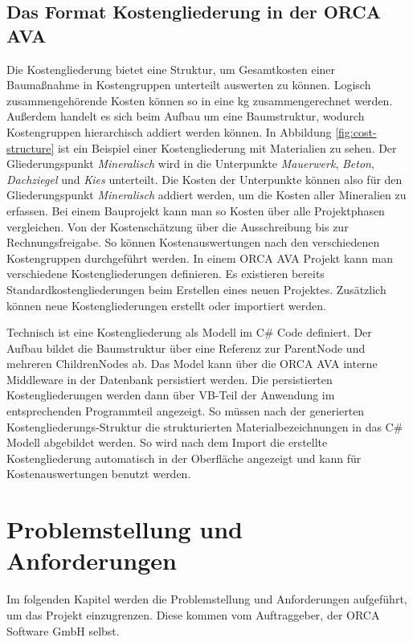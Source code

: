\section{Das Format Kostengliederung in der ORCA AVA}
\label{c:basics:coststructure}
Die Kostengliederung bietet eine Struktur, um Gesamtkosten einer Baumaßnahme in Kostengruppen unterteilt auswerten zu können. Logisch zusammengehörende Kosten können so in eine \ac{kg} zusammengerechnet werden. Außerdem handelt es sich beim Aufbau um eine Baumstruktur, wodurch Kostengruppen hierarchisch addiert werden können. In Abbildung \ref{fig:cost-structure} ist ein Beispiel einer Kostengliederung mit Materialien zu sehen. Der Gliederungspunkt \textit{Mineralisch} wird in die Unterpunkte \textit{Mauerwerk}, \textit{Beton}, \textit{Dachziegel} und \textit{Kies} unterteilt. Die Kosten der Unterpunkte können also für den Gliederungspunkt \textit{Mineralisch} addiert werden, um die Kosten aller Mineralien zu erfassen.
Bei einem Bauprojekt kann man so Kosten über alle Projektphasen vergleichen. Von der Kostenschätzung über die  Ausschreibung bis zur Rechnungsfreigabe. So können Kostenauswertungen nach den verschiedenen Kostengruppen durchgeführt werden. In einem ORCA AVA Projekt kann man verschiedene Kostengliederungen definieren. Es existieren bereits Standardkostengliederungen beim Erstellen eines neuen Projektes. Zusätzlich können neue Kostengliederungen erstellt oder importiert werden.\citep{helpdesk-kostengliederungen}


Technisch ist eine Kostengliederung als Modell im C\# Code definiert. Der Aufbau bildet die Baumstruktur über eine Referenz zur ParentNode und mehreren ChildrenNodes ab. Das Model kann über die ORCA AVA interne Middleware in der Datenbank persistiert werden. Die persistierten Kostengliederungen werden dann über VB-Teil der Anwendung im entsprechenden Programmteil angezeigt.
So müssen nach der generierten Kostengliederungs-Struktur die strukturierten Materialbezeichnungen in das C\# Modell abgebildet werden. So wird nach dem Import die erstellte Kostengliederung automatisch in der Oberfläche angezeigt und kann für Kostenauswertungen benutzt werden.


\chapter{Problemstellung und Anforderungen}
\label{c:requirements}
Im folgenden Kapitel werden die Problemstellung und Anforderungen aufgeführt, um das Projekt einzugrenzen. Diese kommen vom Auftraggeber, der \glqq ORCA Software GmbH\grqq{} selbst.

